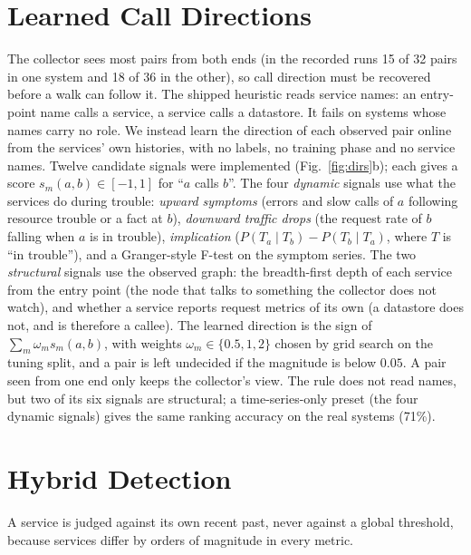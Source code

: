 \documentclass[journal]{IEEEtran}
\begin{document}
\section{Learned Call Directions}
\label{sec:dirs}
The collector sees most pairs from both ends (in the recorded runs 15 of 32 pairs in one system and 18 of 36 in the other), so
call direction must be recovered before a walk can follow it. The shipped heuristic reads service names: an entry-point name calls a
service, a service calls a datastore. It fails on systems whose names carry no role. We instead learn the direction of each
observed pair online from the services' own histories, with no labels, no training phase and no service names. Twelve candidate
signals were implemented (Fig.~\ref{fig:dirs}b); each gives a score $s_m(a,b)\in[-1,1]$ for ``$a$ calls $b$''. The four \emph{dynamic}
signals use what the services do during trouble: \emph{upward symptoms} (errors and slow calls of $a$ following resource trouble or a fact at $b$),
\emph{downward traffic drops} (the request rate of $b$ falling when $a$ is in trouble), \emph{implication}
($P(T_a\!\mid\!T_b)-P(T_b\!\mid\!T_a)$, where $T$ is ``in trouble''), and a Granger-style F-test on the symptom series. The two \emph{structural}
signals use the observed graph: the breadth-first depth of each service from the entry point (the node that talks to something the collector does not
watch), and whether a service reports request metrics of its own (a datastore does not, and is therefore a callee). The learned direction is the sign of
$\sum_m \omega_m s_m(a,b)$, with weights $\omega_m\in\{0.5,1,2\}$ chosen by grid search on the tuning split, and a pair is left undecided if the magnitude is
below $0.05$. A pair seen from one end only keeps the collector's view. The rule does not read names, but two of its six signals are structural; a
time-series-only preset (the four dynamic signals) gives the same ranking accuracy on the real systems (71\%).

\section{Hybrid Detection}
\label{sec:detect}
A service is judged against its own recent past, never against a global threshold, because services differ by orders of
magnitude in every metric.
\end{document}
